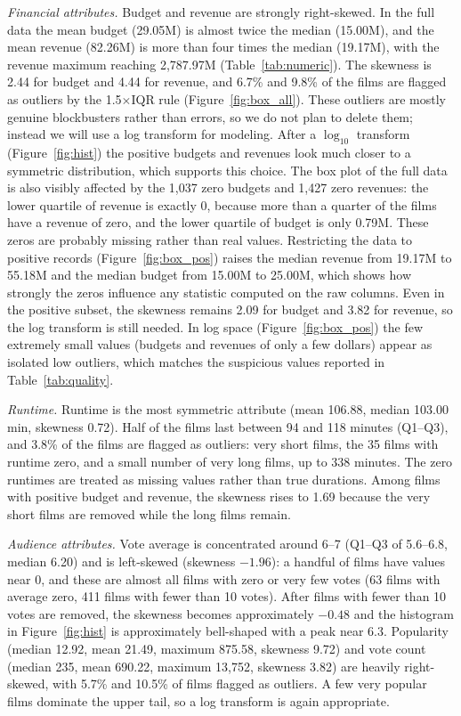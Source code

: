 \documentclass[conference]{IEEEtran}
\begin{document}
\textit{Financial attributes.}
Budget and revenue are strongly right-skewed. In the full data the mean
budget (29.05M) is almost twice the median (15.00M), and the mean revenue
(82.26M) is more than four times the median (19.17M), with the revenue
maximum reaching 2,787.97M (Table~\ref{tab:numeric}). The skewness is 2.44 for
budget and 4.44 for revenue, and 6.7\% and 9.8\% of the films are flagged
as outliers by the 1.5$\times$IQR rule (Figure~\ref{fig:box_all}). These
outliers are mostly genuine blockbusters rather than errors, so we do not
plan to delete them; instead we will use a log transform for modeling.
After a $\log_{10}$ transform (Figure~\ref{fig:hist}) the positive budgets
and revenues look much closer to a symmetric distribution, which supports
this choice. The box plot of the full data is also visibly affected by the
1,037 zero budgets and 1,427 zero revenues: the lower quartile of revenue
is exactly 0, because more than a quarter of the films have a revenue of
zero, and the lower quartile of budget is only 0.79M. These zeros are
probably missing rather than real values. Restricting the data to positive
records (Figure~\ref{fig:box_pos}) raises the median revenue from 19.17M to
55.18M and the median budget from 15.00M to 25.00M, which shows how
strongly the zeros influence any statistic computed on the raw columns.
Even in the positive subset, the skewness remains 2.09 for budget and
3.82 for revenue, so the log transform is still needed. In log space
(Figure~\ref{fig:box_pos}) the few extremely small values (budgets and
revenues of only a few dollars) appear as isolated low outliers, which
matches the suspicious values reported in Table~\ref{tab:quality}.
 
\textit{Runtime.}
Runtime is the most symmetric attribute (mean 106.88, median 103.00 min,
skewness 0.72). Half of the films last between 94 and 118 minutes
(Q1--Q3), and 3.8\% of the films are flagged as outliers: very short
films, the 35 films with runtime zero, and a small number of very long
films, up to 338 minutes. The zero runtimes are treated as missing values
rather than true durations. Among films with positive budget and revenue,
the skewness rises to 1.69 because the very short films are removed while
the long films remain.
 
\textit{Audience attributes.}
Vote average is concentrated around 6--7 (Q1--Q3 of 5.6--6.8, median
6.20) and is left-skewed (skewness $-1.96$): a handful of films have
values near 0, and these are almost all films with zero or very few votes
(63 films with average zero, 411 films with fewer than 10 votes). After films with fewer than 10 votes are removed, the skewness becomes approximately $-0.48$ and the histogram in Figure~\ref{fig:hist} is approximately bell-shaped with a peak near 6.3. Popularity (median 12.92, mean 21.49,
maximum 875.58, skewness 9.72) and vote count (median 235, mean 690.22,
maximum 13,752, skewness 3.82) are heavily right-skewed, with 5.7\% and
10.5\% of films flagged as outliers. A few very popular films dominate the
upper tail, so a log transform is again appropriate.
 
\end{document}

